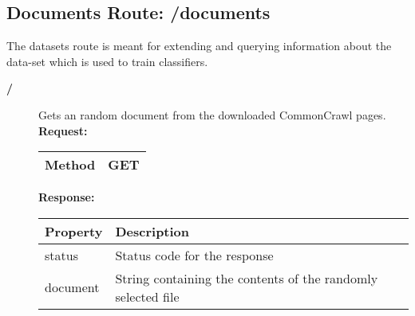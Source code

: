 \subsection{Documents Route: /documents}
The datasets route is meant for extending and querying information about the data-set which is used to train classifiers. 

\begin{description}


\item [{\large \textbf{/}}]
Gets an random document from the downloaded CommonCrawl pages.
\newline
\newline
\textbf{Request:}
\newline
\newline
\begin{tabular}{ | l | l |}
\hline
Method & GET\\ \hline
\end{tabular}
\newline
\newline
\textbf{Response:}
\newline
\newline
\resizebox{\textwidth}{!} {
\begin{tabular}{ | l | l |}
\hline
\textbf{Property} & \textbf{Description}\\ \hline
status & Status code for the response\\ \hline
document & String containing the contents of the randomly selected file\\ \hline
\end{tabular}}

\end{description}